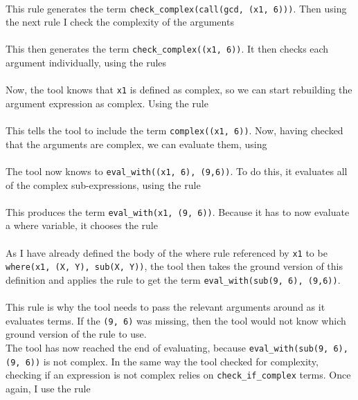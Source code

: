 
\mbox{} \\
This rule generates the term \lstinline{check_complex(call(gcd, (x1, 6)))}. Then using the next rule I check the complexity of the arguments \\ %


\mbox{} \\
This then generates the term \lstinline{check_complex((x1, 6))}. It then checks each argument individually, using the rules  \\ %


\mbox{} \\
Now, the tool knows that \lstinline{x1} is defined as complex, so we can start rebuilding the argument expression as complex. Using the rule  \\ %


\mbox{} \\
This tells the tool to include the term \lstinline{complex((x1, 6))}. Now, having checked that the arguments are complex, we can evaluate them, using \\ %


\mbox{} \\
The tool now knows to \lstinline{eval_with((x1, 6), (9,6))}. To do this, it evaluates all of the complex sub-expressions, using the rule \\ %


\mbox{} \\
This produces the term \lstinline{eval_with(x1, (9, 6))}. Because it has to now evaluate a where variable, it chooses the rule \\ %


\mbox{} \\
As I have already defined the body of the where rule referenced by \lstinline{x1} to be \lstinline{where(x1, (X, Y), sub(X, Y))}, the tool then takes the ground version of this definition and applies the rule to get the term \lstinline{eval_with(sub(9, 6), (9,6))}. \\ \\%
This rule is why the tool needs to pass the relevant arguments around as it evaluates terms. If the \lstinline{(9, 6)} was missing, then the tool would not know which ground version of the rule to use.\\ %
The tool has now reached the end of evaluating, because \lstinline{eval_with(sub(9, 6), (9, 6))} is not complex. In the same way the tool checked for complexity, checking if an expression is not complex relies on \lstinline{check_if_complex} terms. Once again, I use the rule\\


